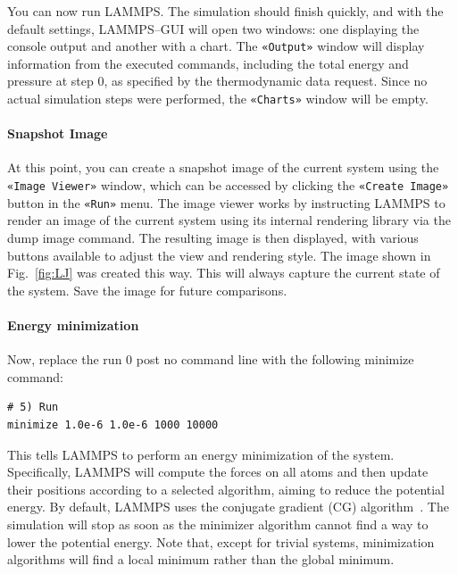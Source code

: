 \documentclass[9pt,tutorial]{livecoms}
\newcommand{\lmpcmd}[1]{\hspace{0pt}\colorbox{listing}{\textcolor{command}{\small{#1}}}\hspace{0pt}} %
\newcommand{\guicmd}[1]{\textcolor{command}{\texttt{«#1»}}} %
\begin{document}
You can now run LAMMPS.  The simulation should finish quickly, and with the default
settings, LAMMPS--GUI will open two windows: one displaying the console
output and another with a chart.  The \guicmd{Output} window will display information from
the executed commands, including the total energy and pressure at step 0,
as specified by the thermodynamic data request.  Since no actual simulation
steps were performed, the \guicmd{Charts} window will be empty.

\paragraph{Snapshot Image}

At this point, you can create a snapshot image of the
current system using the \guicmd{Image Viewer} window, which can be
accessed by clicking the \guicmd{Create Image} button in the \guicmd{Run} menu.
The image viewer works by instructing LAMMPS to render an image of the current system using
its internal rendering library via the \lmpcmd{dump image} command.  The
resulting image is then displayed, with various buttons available to adjust
the view and rendering style.  The image shown in
Fig.~\ref{fig:LJ} was created this way.  This will always capture the current
state of the system.  Save the image for future comparisons.

\paragraph{Energy minimization}

Now, replace the \lmpcmd{run 0 post no} command line with the
following \lmpcmd{minimize} command:
\begin{lstlisting}
# 5) Run
minimize 1.0e-6 1.0e-6 1000 10000
\end{lstlisting}
This tells LAMMPS to perform an energy minimization of the system.
Specifically, LAMMPS will compute the forces on all atoms and then update their
positions according to a selected algorithm, aiming to reduce
the potential energy.  By default, LAMMPS uses the conjugate gradient (CG)
algorithm~\cite{hestenes1952methods}.  The simulation will stop as soon
as the minimizer algorithm cannot find a way to lower the potential
energy. %
Note that, except for trivial systems, minimization algorithms will find a
local minimum rather than the global minimum.
\end{document}
